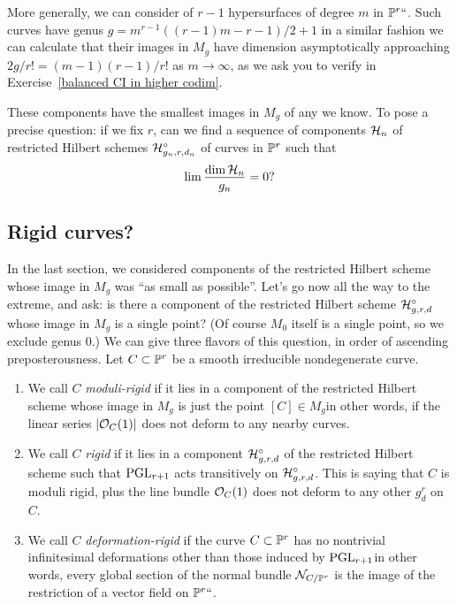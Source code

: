 More generally, we can consider 
%
of $r-1$
hypersurfaces of degree $m$ in $\mathbb P^r` `$. Such curves have
genus $g = m^{r-1}((r-1)m-r-1)/2 +1$ in a similar fashion we can calculate
that their images in $M_g$ have dimension asymptotically approaching
$2g/r!= (m-1)(r-1)/r!$
 as $m \to \infty$, as we ask you to verify in Exercise~\ref{balanced
 CI in higher codim}.


These components have the smallest images in $M_{g}$ of any we know. To
pose a precise question: if we fix $r$, can we find a sequence of
components $\mathcal H_n$ of  restricted Hilbert schemes  $\mathcal H^\circ_{g_n,r,d_n}$
of curves in $\mathbb P^r$ such that
$$
\lim \frac{\dim \cH_n}{g_n} \; = \; 0?
$$

\subsection*{Rigid curves?}
\label{rigid?} %

In the last section, we considered components of the restricted Hilbert
scheme whose image in $M_g$ was ``as small as possible''. Let's go now all
the way to the extreme, and ask: is there a component of the restricted
Hilbert scheme $\mathcal H^\circ_{g,r,d}$ whose image in $M_g$ is a single
point? (Of course $M_0$ itself is a single point, so we exclude genus
0.) We can give three flavors of this question, in order of ascending
preposterousness. Let $C \subset \mathbb P^r$ be
a smooth irreducible nondegenerate curve.

\begin{enumerate}
\item We call $C$ \emph{moduli-rigid} if it lies in a component of the
%
restricted Hilbert scheme whose image in $M_g$ is just the point $[C]
\in M_g$\emdash in other words, if the linear series $|{\mathcal O}_C(1)|$ does not
deform to any nearby curves.

\item We call $C$ \emph{rigid} if it lies in a component
%
$\mathcal H^\circ_{g,r,d}$ of the restricted Hilbert scheme such that $\operatorname{PGL}_{r+1}$
acts transitively on $\mathcal H^\circ_{g,r,d}$. This is saying that $C$ is
moduli rigid, plus the line bundle ${\mathcal O}_C(1)$ does not deform to any
other $g^r_d$ on $C$.

\item We call $C$ \emph{deformation-rigid} if the curve $C \subset \mathbb P^r$
%
has no nontrivial infinitesimal deformations other than those induced
by $\operatorname{PGL}_{r+1}$\emdash in other words, every global section of the normal
bundle ${\mathcal N}_{C/\mathbb P^r}$ is the image of the restriction of a vector field
on $\mathbb P^r` `$.
\end{enumerate}


